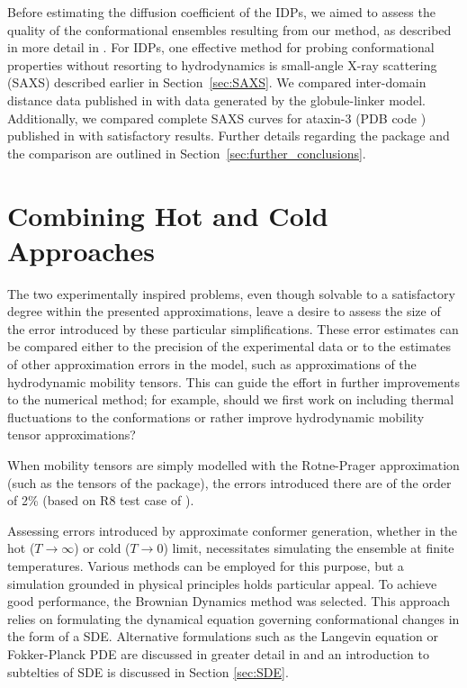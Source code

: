 \documentclass{doctoral}
\newcommand{\code}[1]{\texttt{\detokenize{#1}}}
\begin{document}
Before estimating the diffusion coefficient of the IDPs, we aimed to assess the quality of the conformational ensembles resulting from our method, as described in more detail in \textcite{Waszkiewicz_2024_mda}.
For IDPs, one effective method for probing conformational properties without resorting to hydrodynamics is small-angle X-ray scattering (SAXS) described earlier in Section~\ref{sec:SAXS}.
We compared inter-domain distance data published in \textcite{Rozycki_2022} with data generated by the globule-linker model.
Additionally, we compared complete SAXS curves for ataxin-3 (PDB code \code{1yzb}) published in \cite{Lin_2017} with satisfactory results.
Further details regarding the \code{saxs_single_bead} package and the comparison are outlined in Section~\ref{sec:further_conclusions}.

\section{Combining Hot and Cold Approaches}
\label{sec:combining_hot_and_cold_approaches}
The two experimentally inspired problems, even though solvable to a satisfactory degree within the presented approximations, leave a desire to assess the size of the error introduced by these particular simplifications.
These error estimates can be compared either to the precision of the experimental data or to the estimates of other approximation errors in the model, such as approximations of the hydrodynamic mobility tensors.
This can guide the effort in further improvements to the numerical method; for example, should we first work on including thermal fluctuations to the conformations or rather improve hydrodynamic mobility tensor approximations?

When mobility tensors are simply modelled with the Rotne-Prager approximation (such as the tensors of the \code{pygrpy} package), the errors introduced there are of the order of 2\% (based on R8 test case of \cite{Zuk_2018}).

Assessing errors introduced by approximate conformer generation, whether in the hot ($T\to\infty$) or cold ($T\to0$) limit, necessitates simulating the ensemble at finite temperatures.
Various methods can be employed for this purpose, but a simulation grounded in physical principles holds particular appeal.
To achieve good performance, the Brownian Dynamics method was selected.
This approach relies on formulating the dynamical equation governing conformational changes in the form of a SDE.
Alternative formulations such as the Langevin equation or Fokker-Planck PDE are discussed in greater detail in \textcite{Waszkiewicz_2023_pychastic} and an introduction to subtelties of SDE is discussed in Section \ref{sec:SDE}.
\end{document}
